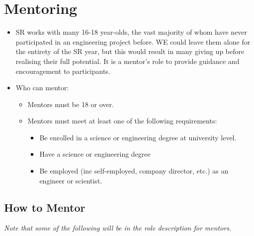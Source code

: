 \section{Mentoring}

\begin{itemize}
\item SR works with many 16-18 year-olds, the vast majority of whom have never participated in an engineering project before.  WE could leave them alone for the entirety of the SR year, but this would result in many giving up before realising their full potential.  It is a mentor's role to provide guidance and encouragement to participants.

\item Who can mentor:
  \begin{itemize}
  \item Mentors must be 18 or over.
  \item Mentors must meet at least one of the following requirements:
    \begin{itemize}
    \item Be enrolled in a science or engineering degree at university level.
    \item Have a science or engineering degree
    \item Be employed (inc self-employed, company director, etc.) as an engineer or scientist.
    \end{itemize}
  \end{itemize}
\end{itemize}

\subsection{How to Mentor}

\textit{Note that some of the following will be in the role description for mentors.}


